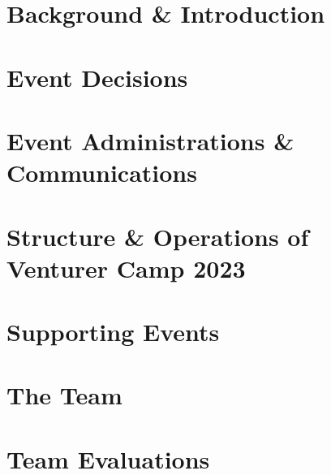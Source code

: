 \documentclass[a4paper, 11pt]{report}
\begin{document}
\makeDocumentTitle

\tableofcontents


\part{Background \& Introduction} %
    
    
    
\part{Event Decisions} %
    
    
    
    
    
    
\part{Event Administrations \& Communications} %
    
    
    
    
    
\part{Structure \& Operations of Venturer Camp 2023} %
    
    
    
    
    
\part{Supporting Events} %
    
    
    
    
    
\part{The Team} %
    
    
    
    
    
\part{Team Evaluations} %
    
    
    
    
    
    
    
    
    
    
\end{document}
